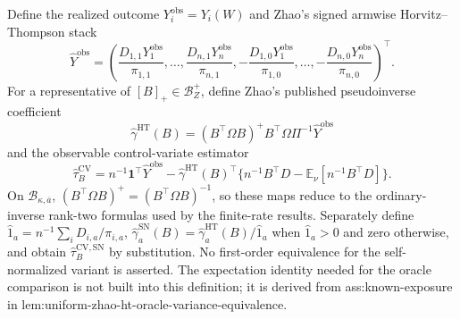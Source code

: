 Define the realized outcome \(Y_i^{\mathrm{obs}}=Y_i(W)\) and Zhao's signed armwise Horvitz--Thompson stack
\[
\widehat Y^{\mathrm{obs}}=
\left(\frac{D_{1,1}Y_1^{\mathrm{obs}}}{\pi_{1,1}},\ldots,
\frac{D_{n,1}Y_n^{\mathrm{obs}}}{\pi_{n,1}},
-\frac{D_{1,0}Y_1^{\mathrm{obs}}}{\pi_{1,0}},\ldots,
-\frac{D_{n,0}Y_n^{\mathrm{obs}}}{\pi_{n,0}}\right)^{\top}.
\]
For a representative of \([B]_+\in\mathcal B_Z^+\), define Zhao's published pseudoinverse coefficient
\[
\widehat\gamma^{\mathrm{HT}}(B)
=(B^{\top}\Omega B)^+B^{\top}\Omega\Pi^{-1}\widehat Y^{\mathrm{obs}}
\]
and the observable control-variate estimator
\[
\widehat\tau_B^{\mathrm{CV}}
=n^{-1}\mathbf1^{\top}\widehat Y^{\mathrm{obs}}
-\widehat\gamma^{\mathrm{HT}}(B)^{\top}
\{n^{-1}B^{\top}D-\mathbb E_\nu[n^{-1}B^{\top}D]\}.
\]
On \(\mathcal B_{\kappa,\overline a}\), \((B^{\top}\Omega B)^+=(B^{\top}\Omega B)^{-1}\), so these maps reduce to the ordinary-inverse rank-two formulas used by the finite-rate results.  Separately define \(\widehat1_a=n^{-1}\sum_iD_{i,a}/\pi_{i,a}\), \(\widehat\gamma_a^{\mathrm{SN}}(B)=\widehat\gamma_a^{\mathrm{HT}}(B)/\widehat1_a\) when \(\widehat1_a>0\) and zero otherwise, and obtain \(\widehat\tau_B^{\mathrm{CV,SN}}\) by substitution.  No first-order equivalence for the self-normalized variant is asserted.  The expectation identity needed for the oracle comparison is not built into this definition; it is derived from ass:known-exposure in lem:uniform-zhao-ht-oracle-variance-equivalence.